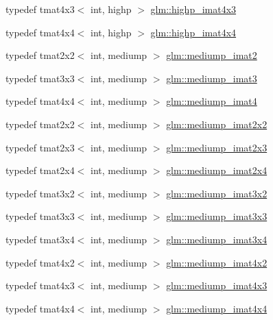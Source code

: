 \begin{DoxyCompactItemize}
typedef tmat4x3$<$ int, highp $>$ \hyperlink{group__gtc__matrix__integer_ga28e21d3fe05d8476402e27081150cade}{glm\-::highp\-\_\-imat4x3}
\item 
typedef tmat4x4$<$ int, highp $>$ \hyperlink{group__gtc__matrix__integer_ga2a80b8ab686297145ecf713699233114}{glm\-::highp\-\_\-imat4x4}
\item 
typedef tmat2x2$<$ int, mediump $>$ \hyperlink{group__gtc__matrix__integer_gae812330b83568359273b6ec96b002863}{glm\-::mediump\-\_\-imat2}
\item 
typedef tmat3x3$<$ int, mediump $>$ \hyperlink{group__gtc__matrix__integer_gab033bd6a2bfebb1aa35d458c6f077ccb}{glm\-::mediump\-\_\-imat3}
\item 
typedef tmat4x4$<$ int, mediump $>$ \hyperlink{group__gtc__matrix__integer_ga680c97868de08658ca4924718d951def}{glm\-::mediump\-\_\-imat4}
\item 
typedef tmat2x2$<$ int, mediump $>$ \hyperlink{group__gtc__matrix__integer_ga52a40f2f95562746fd8084726a300963}{glm\-::mediump\-\_\-imat2x2}
\item 
typedef tmat2x3$<$ int, mediump $>$ \hyperlink{group__gtc__matrix__integer_ga07314e9f05b82367570ca44c3ef7c0a7}{glm\-::mediump\-\_\-imat2x3}
\item 
typedef tmat2x4$<$ int, mediump $>$ \hyperlink{group__gtc__matrix__integer_ga944a139f15de6bc12e9c7bf615ffc4f5}{glm\-::mediump\-\_\-imat2x4}
\item 
typedef tmat3x2$<$ int, mediump $>$ \hyperlink{group__gtc__matrix__integer_ga8f682b5b64e2072c0729409ee6bfe2af}{glm\-::mediump\-\_\-imat3x2}
\item 
typedef tmat3x3$<$ int, mediump $>$ \hyperlink{group__gtc__matrix__integer_gab4c647321a342c58119144ad08c6c406}{glm\-::mediump\-\_\-imat3x3}
\item 
typedef tmat3x4$<$ int, mediump $>$ \hyperlink{group__gtc__matrix__integer_ga721a754fc35cc5ac097e331d893a6b2c}{glm\-::mediump\-\_\-imat3x4}
\item 
typedef tmat4x2$<$ int, mediump $>$ \hyperlink{group__gtc__matrix__integer_gabfe107153637dfd7a0c272ff1ba892ed}{glm\-::mediump\-\_\-imat4x2}
\item 
typedef tmat4x3$<$ int, mediump $>$ \hyperlink{group__gtc__matrix__integer_ga0da8b13e141337d016a6541ea2c0362c}{glm\-::mediump\-\_\-imat4x3}
\item 
typedef tmat4x4$<$ int, mediump $>$ \hyperlink{group__gtc__matrix__integer_gae226af929e72730be59a58d89a4be028}{glm\-::mediump\-\_\-imat4x4}
\item 

\end{DoxyCompactItemize}
